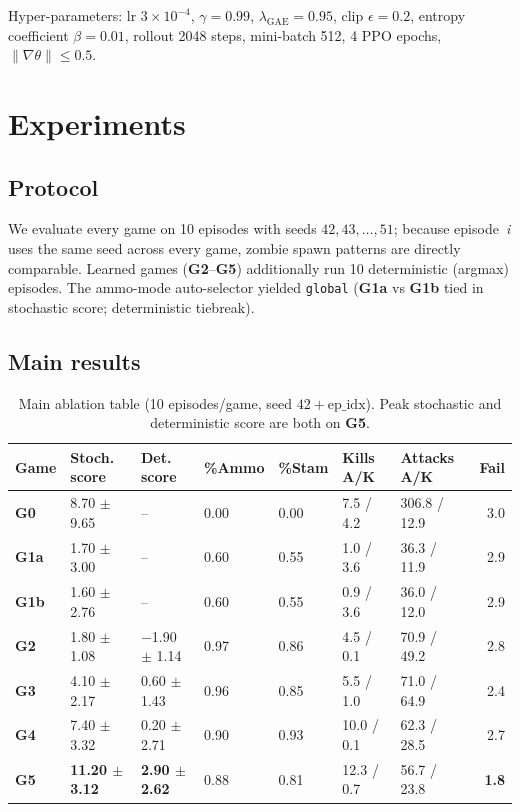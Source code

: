 \documentclass[11pt,a4paper]{article}
\newcommand{\gz}{\textbf{G0}}
\newcommand{\ga}{\textbf{G1a}}
\newcommand{\gb}{\textbf{G1b}}
\newcommand{\gii}{\textbf{G2}}
\newcommand{\giii}{\textbf{G3}}
\newcommand{\giv}{\textbf{G4}}
\newcommand{\gv}{\textbf{G5}}
\begin{document}
Hyper-parameters: lr $3\times 10^{-4}$, $\gamma = 0.99$,
$\lambda_{\text{GAE}} = 0.95$, clip $\epsilon = 0.2$, entropy coefficient
$\beta = 0.01$, rollout 2048 steps, mini-batch 512, 4 PPO epochs,
$\|\nabla\theta\| \le 0.5$.

\section{Experiments}
\label{sec:experiments}

\subsection{Protocol}

We evaluate every game on 10 episodes with seeds $42, 43, \dots, 51$;
because episode~\emph{i} uses the same seed across every game, zombie
spawn patterns are directly comparable. Learned games (\gii--\gv{})
additionally run 10 deterministic (argmax) episodes. The ammo-mode
auto-selector yielded \texttt{global} (\ga{} vs \gb{} tied in stochastic
score; deterministic tiebreak).

\subsection{Main results}

\begin{table}[H]
\centering
\caption{Main ablation table (10 episodes/game, seed $42 + \text{ep\_idx}$).
Peak stochastic and deterministic score are both on \gv{}.}
\label{tab:main}
\small
\begin{tabular}{@{}lllllllr@{}}
\toprule
\textbf{Game} & \textbf{Stoch. score} & \textbf{Det. score} & \textbf{\%Ammo} & \textbf{\%Stam} & \textbf{Kills A/K} & \textbf{Attacks A/K} & \textbf{Fail} \\
\midrule
\gz{}    & 8.70 $\pm$ 9.65        & --                    & 0.00 & 0.00 & 7.5 / 4.2  & 306.8 / 12.9 & 3.0 \\
\ga{}    & 1.70 $\pm$ 3.00        & --                    & 0.60 & 0.55 & 1.0 / 3.6  & 36.3 / 11.9  & 2.9 \\
\gb{}    & 1.60 $\pm$ 2.76        & --                    & 0.60 & 0.55 & 0.9 / 3.6  & 36.0 / 12.0  & 2.9 \\
\gii{}   & 1.80 $\pm$ 1.08        & $-$1.90 $\pm$ 1.14    & 0.97 & 0.86 & 4.5 / 0.1  & 70.9 / 49.2  & 2.8 \\
\giii{}  & 4.10 $\pm$ 2.17        & \phantom{$-$}0.60 $\pm$ 1.43 & 0.96 & 0.85 & 5.5 / 1.0  & 71.0 / 64.9 & 2.4 \\
\giv{}   & 7.40 $\pm$ 3.32        & \phantom{$-$}0.20 $\pm$ 2.71 & 0.90 & 0.93 & 10.0 / 0.1 & 62.3 / 28.5 & 2.7 \\
\gv{}    & \textbf{11.20 $\pm$ 3.12} & \textbf{2.90 $\pm$ 2.62} & 0.88 & 0.81 & 12.3 / 0.7 & 56.7 / 23.8 & \textbf{1.8} \\
\bottomrule
\end{tabular}
\end{table}
\end{document}
